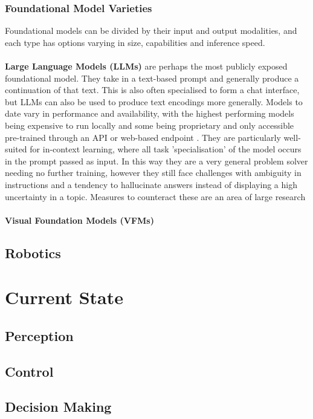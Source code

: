 \subsubsection{Foundational Model Varieties}
Foundational models can be divided by their input and output modalities, and each type has options varying in size, capabilities and inference speed.
\\ \\
\textbf{Large Language Models (LLMs)} are perhaps the most publicly exposed foundational model. They take in a text-based prompt and generally produce a continuation of that text. This is also often specialised to form a chat interface, but LLMs can also be used to produce text encodings more generally. Models to date vary in performance and availability, with the highest performing models being expensive to run locally and some being proprietary and only accessible pre-trained through an API or web-based endpoint \cite{Zhou2023A}.
They are particularly well-suited for in-context learning, where all task 'specialisation' of the model occurs in the prompt passed as input. In this way they are a very general problem solver needing no further training, however they still face challenges with ambiguity in instructions and a tendency to hallucinate answers instead of displaying a high uncertainty in a topic. Measures to counteract these are an area of large research 
\\ \\
\textbf{Visual Foundation Models (VFMs)} 

\subsection{Robotics}

\section{Current State}

\subsection{Perception}

\subsection{Control}

\subsection{Decision Making}
\subsubsection{}


